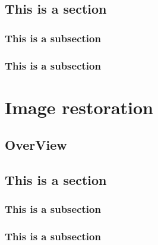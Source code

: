 \documentclass[11pt,oneside]{book}
\begin{document}
\section{This is a section}
\subsection{This is a subsection}
\subsection{This is a subsection}

\chapter{Image restoration}
\section{OverView}


\section{This is a section}
\subsection{This is a subsection}
\subsection{This is a subsection}
\end{document}
